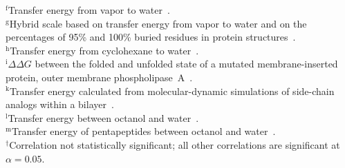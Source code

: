 \documentclass[11pt]{article}
\begin{document}
\begin{table}[H]
{\begin{raggedright}
$^\text{f}$Transfer energy from vapor to water~\cite{Wolfenden1981}.\\
$^\text{g}$Hybrid scale based on transfer energy from vapor to water and on the percentages of 95\% and 100\% buried residues in protein structures~\cite{Kyte1981}.\\
$^\text{h}$Transfer energy from cyclohexane to water~\cite{Radzicka1988}.\\
$^\text{i}$$\Delta\Delta G$ between the folded and unfolded state of a mutated membrane-inserted protein, outer membrane phospholipase~A~\cite{Moon2011}. \\
$^\text{k}$Transfer energy calculated from molecular-dynamic simulations of side-chain analogs within a bilayer~\cite{MacCallum2007}.\\
$^\text{l}$Transfer energy between octanol and water~\cite{Fauchere1983}.\\
$^\text{m}$Transfer energy of pentapeptides between octanol and water~\cite{Wimley1996}.\\
$^\dagger$Correlation not statistically significant; all other correlations are significant at $\alpha=0.05$.\\
\end{raggedright}
}
\end{table}
\end{document}
